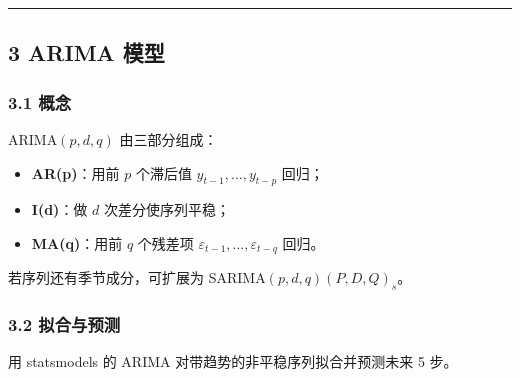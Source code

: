 \begin{center}\rule{0.5\linewidth}{0.5pt}\end{center}

\subsection{3 ARIMA 模型}\label{arima-ux6a21ux578b}

\subsubsection{3.1 概念}\label{ux6982ux5ff5-4}

ARIMA\((p,d,q)\) 由三部分组成：

\begin{itemize}
\tightlist
\item
  \textbf{AR(p)}：用前 \(p\) 个滞后值 \(y_{t-1}, \dots, y_{t-p}\) 回归；
\item
  \textbf{I(d)}：做 \(d\) 次差分使序列平稳；
\item
  \textbf{MA(q)}：用前 \(q\) 个残差项
  \(\varepsilon_{t-1}, \dots, \varepsilon_{t-q}\) 回归。
\end{itemize}

若序列还有季节成分，可扩展为 SARIMA\((p,d,q)(P,D,Q)_s\)。

\subsubsection{3.2 拟合与预测}\label{ux62dfux5408ux4e0eux9884ux6d4b}

用 statsmodels 的 ARIMA 对带趋势的非平稳序列拟合并预测未来 5 步。

